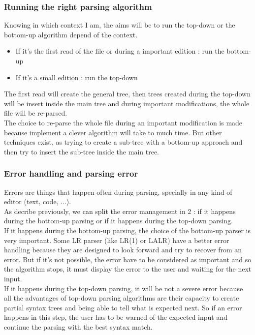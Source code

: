\subsubsection{Running the right parsing algorithm}
Knowing in which context I am, the aims will be to run the top-down or the bottom-up algorithm depend of the context.
\begin{itemize}
\item If it's the first read of the file or during a important edition : run the bottom-up
\item If it's a small edition : run the top-down
\end{itemize}

The first read will create the general tree, then trees created during the top-down will be insert inside the main tree and during important modifications, the whole file will be re-parsed.\\
The choice to re-parse the whole file during an important modification is made because implement a clever algorithm will take to much time. But other techniques exist, as trying to create a sub-tree with a bottom-up approach and then try to insert the sub-tree inside the main tree.

\subsubsection{Error handling and parsing error}
Errors are things that happen often during parsing, specially in any kind of editor (text, code, ...).\\
As decribe previously, we can split the error management in 2 : if it happens during the bottom-up parsing or if it happens during the top-down parsing.\\
If it happens during the bottom-up parsing, the choice of the bottom-up parser is very important. Some LR parser (like LR(1) or LALR) have a better error handling because they are designed to look forward and try to recover from an error.
But if it's not possible, the error have to be considered as important and so the algorithm stops, it must display the error to the user and waiting for the next input.\\
If it happens during the top-down parsing, it will be not a severe error because all the advantages of top-down parsing algorithms are their capacity to create partial syntax trees and being able to tell what is expected next. So if an error happens in this step, the user has to be warned of the expected input and continue the parsing with the best syntax match.


